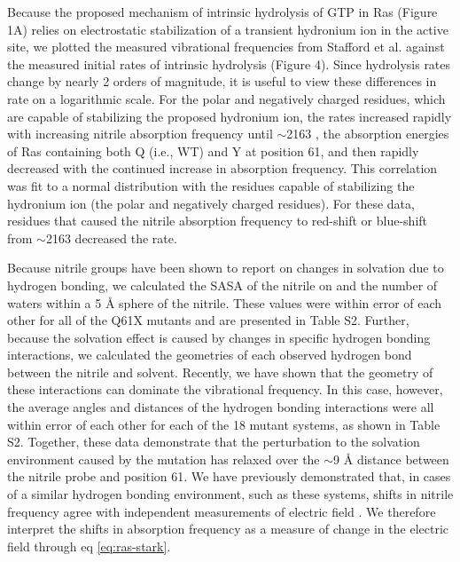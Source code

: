 Because the proposed mechanism of intrinsic hydrolysis of GTP in Ras (Figure 1A) relies on electrostatic stabilization of a transient hydronium ion in the active site, we plotted the measured vibrational frequencies from Stafford et al.\cite{Stafford2012} against the measured initial rates of intrinsic hydrolysis (Figure 4). 
Since hydrolysis rates change by nearly 2 orders of magnitude, it is useful to view these differences in rate on a logarithmic scale. 
For the polar and negatively charged residues, which are capable of stabilizing the proposed hydronium ion, the rates increased rapidly with increasing nitrile absorption frequency until $\sim$2163 \si{\wn}, the absorption energies of Ras containing both Q (i.e., WT) and Y at position 61, and then rapidly decreased with the continued increase in absorption frequency. 
This correlation was fit to a normal distribution with the residues capable of stabilizing the hydronium ion (the polar and negatively charged residues). 
For these data, residues that caused the nitrile absorption frequency to red-shift or blue-shift from $\sim$2163 \si{\wn} decreased the rate.

Because nitrile groups have been shown to report on changes in solvation due to hydrogen bonding, we calculated the SASA of the nitrile on \RalBSCN{} and the number of waters within a 5 \si{\angstrom} sphere of the nitrile. 
These values were within error of each other for all of the Q61X mutants and are presented in Table S2. 
Further, because the solvation effect is caused by changes in specific hydrogen bonding interactions\cite{Choi2008}, we calculated the geometries of each observed hydrogen bond between the nitrile and solvent. 
Recently, we have shown that the geometry of these interactions can dominate the vibrational frequency\cite{First2018}.
In this case, however, the average angles and distances of the hydrogen bonding interactions were all within error of each other for each of the 18 mutant systems, as shown in Table S2. 
Together, these data demonstrate that the perturbation to the solvation environment caused by the mutation has relaxed over the $\sim$9 \si{\angstrom} distance between the nitrile probe and position 61. 
We have previously demonstrated that, in cases of a similar hydrogen bonding environment, such as these systems, shifts in nitrile frequency agree with independent measurements of electric field \cite{Slocum2016, Slocum2017}.
We therefore interpret the shifts in absorption frequency as a measure of change in the electric field through eq \ref{eq:ras-stark}.

